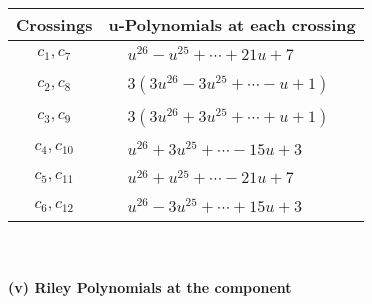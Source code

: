 \documentclass[1p]{elsarticle_modified}
\theoremstyle{definition}
\begin{document}
\begin{tabular}{m{50pt}|m{274pt}}
Crossings & \hspace{64pt}u-Polynomials at each crossing \\
\hline $$\begin{aligned}c_{1},c_{7}\end{aligned}$$&$\begin{aligned}
&u^{26}- u^{25}+\cdots+21 u+7
\end{aligned}$\\
\hline $$\begin{aligned}c_{2},c_{8}\end{aligned}$$&$\begin{aligned}
&3(3 u^{26}-3 u^{25}+\cdots- u+1)
\end{aligned}$\\
\hline $$\begin{aligned}c_{3},c_{9}\end{aligned}$$&$\begin{aligned}
&3(3 u^{26}+3 u^{25}+\cdots+u+1)
\end{aligned}$\\
\hline $$\begin{aligned}c_{4},c_{10}\end{aligned}$$&$\begin{aligned}
&u^{26}+3 u^{25}+\cdots-15 u+3
\end{aligned}$\\
\hline $$\begin{aligned}c_{5},c_{11}\end{aligned}$$&$\begin{aligned}
&u^{26}+u^{25}+\cdots-21 u+7
\end{aligned}$\\
\hline $$\begin{aligned}c_{6},c_{12}\end{aligned}$$&$\begin{aligned}
&u^{26}-3 u^{25}+\cdots+15 u+3
\end{aligned}$\\
\hline
\end{tabular}\\~\\
\newpage\renewcommand{\arraystretch}{1}
\flushleft \textbf{(v) Riley Polynomials at the component}\newline \\
\end{document}
